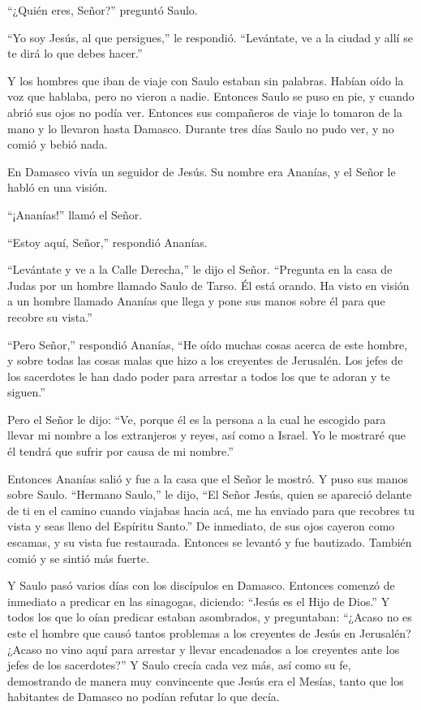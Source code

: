  ``¿Quién eres, Señor?'' preguntó Saulo.

``Yo soy Jesús, al que persigues,'' le respondió. 
``Levántate, ve a la ciudad y allí se te dirá lo que debes hacer.''

 Y los hombres que iban de viaje con Saulo estaban sin
palabras. Habían oído la voz que hablaba, pero no vieron a nadie.
 Entonces Saulo se puso en pie, y cuando abrió sus ojos no
podía ver. Entonces sus compañeros de viaje lo tomaron de la mano y lo
llevaron hasta Damasco.  Durante tres días Saulo no pudo
ver, y no comió y bebió nada.

 En Damasco vivía un seguidor de Jesús. Su nombre era
Ananías, y el Señor le habló en una visión.

``¡Ananías!'' llamó el Señor.

``Estoy aquí, Señor,'' respondió Ananías.

 ``Levántate y ve a la Calle Derecha,'' le dijo el Señor.
``Pregunta en la casa de Judas por un hombre llamado Saulo de Tarso. Él
está orando.  Ha visto en visión a un hombre llamado
Ananías que llega y pone sus manos sobre él para que recobre su vista.''

 ``Pero Señor,'' respondió Ananías, ``He oído muchas cosas
acerca de este hombre, y sobre todas las cosas malas que hizo a los
creyentes de Jerusalén.  Los jefes de los sacerdotes le han
dado poder para arrestar a todos los que te adoran y te siguen.''

 Pero el Señor le dijo: ``Ve, porque él es la persona a la
cual he escogido para llevar mi nombre a los extranjeros y reyes, así
como a Israel.  Yo le mostraré que él tendrá que sufrir por
causa de mi nombre.''

 Entonces Ananías salió y fue a la casa que el Señor le
mostró. Y puso sus manos sobre Saulo. ``Hermano Saulo,'' le dijo, ``El
Señor Jesús, quien se apareció delante de ti en el camino cuando
viajabas hacia acá, me ha enviado para que recobres tu vista y seas
lleno del Espíritu Santo.''  De inmediato, de sus ojos
cayeron como escamas, y su vista fue restaurada. Entonces se levantó y
fue bautizado.  También comió y se sintió más fuerte.

Y Saulo pasó varios días con los discípulos en Damasco. 
Entonces comenzó de inmediato a predicar en las sinagogas, diciendo:
``Jesús es el Hijo de Dios.''  Y todos los que lo oían
predicar estaban asombrados, y preguntaban: ``¿Acaso no es este el
hombre que causó tantos problemas a los creyentes de Jesús en Jerusalén?
¿Acaso no vino aquí para arrestar y llevar encadenados a los creyentes
ante los jefes de los sacerdotes?''  Y Saulo crecía cada
vez más, así como su fe, demostrando de manera muy convincente que Jesús
era el Mesías, tanto que los habitantes de Damasco no podían refutar lo
que decía.

